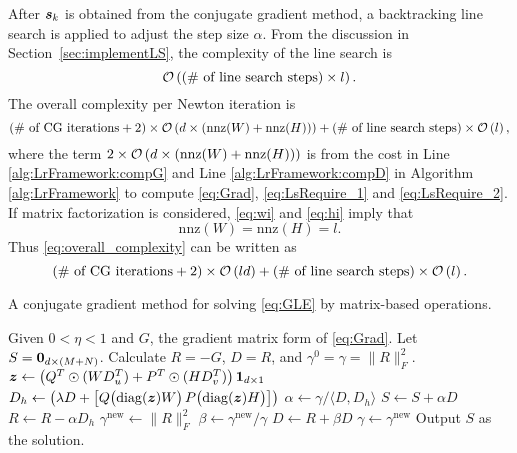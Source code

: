 After $\boldsymbol{s}_k$ is obtained from the conjugate gradient method, a backtracking line search is applied to adjust the step size $\alpha$. From the discussion in Section~\ref{sec:implementLS}, the complexity of the line search is
\begin{equation*}
\mathcal{O}\left((\text{\# of line search steps})\times  l\right).
\end{equation*}
The overall complexity per Newton iteration is
\begin{equation}
(\text{\# of CG iterations}+2)\times \mathcal{O}\left(d \times (\text{nnz}(W)+\text{nnz}(H))\right)+(\text{\# of line search steps})\times \mathcal{O}\left(l\right),
\label{eq:overall_complexity}
\end{equation}
where the term $2\times \mathcal{O}\left(d \times (\text{nnz}(W)+\text{nnz}(H))\right)$ is from the cost in Line \ref{alg:LrFramework:compG} and Line \ref{alg:LrFramework:compD} in Algorithm \ref{alg:LrFramework} to compute \eqref{eq:Grad}, \eqref{eq:LsRequire_1} and \eqref{eq:LsRequire_2}.
If matrix factorization is considered, \eqref{eq:wi} and \eqref{eq:hi} imply that 
\begin{equation}
\text{nnz}(W)=\text{nnz}(H)= l.
\label{eq:nnzWnnzHl}
\end{equation}
Thus \eqref{eq:overall_complexity} can be written as
\begin{equation*}
(\text{\# of CG iterations}+2)\times \mathcal{O}\left(ld\right)+(\text{\# of line search steps})\times \mathcal{O}\left(l\right).
\end{equation*}

\begin{algorithm}[t]
    \caption{A conjugate gradient method for solving \eqref{eq:GLE} by matrix-based operations.}
    \label{alg:CG}
    \begin{algorithmic}[1]
        \State Given $0<\eta<1$ and $G$, the gradient matrix form of \eqref{eq:Grad}. Let $S=\boldsymbol{0}_{d\times (M+N)}$.
        \State Calculate $R = -G$, $D=R$, and $\gamma^0=\gamma=\|R\|_F^2$.
            \State $\boldsymbol{z} \gets \left( {Q^T}\odot{(WD_{u}^T)}+{P^T}\odot{(HD_{v}^T)} \right) \boldsymbol{1}_{d\times 1}$\label{alg:CG:compz}
            \State $D_h \gets \left(\lambda D + \begin{bmatrix} Q \bigl(\operatorname*{diag}(\boldsymbol{z}) W \bigr) \, P \bigl ( \operatorname*{diag}(\boldsymbol{z}) H \bigr) \end{bmatrix}\right) $\label{alg:CG:compDh}
            \State $\alpha \gets \gamma / \langle D,D_h \rangle$
            \State $S \gets S+\alpha D$
            \State $R \gets R-\alpha D_h$
            \State $\gamma^{\text{new}} \gets \|R\|_F^2$
            \State $\beta \gets \gamma^{\text{new}}/\gamma$
            \State $D \gets R+\beta D$
            \State $\gamma \gets \gamma^{\text{new}}$
        \EndWhile
        \State Output $S$ as the solution.
    \end{algorithmic}
\end{algorithm}

